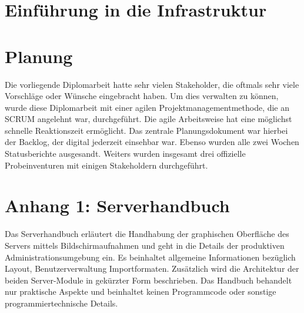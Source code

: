 \documentclass[
    headings=optiontotocandhead,%
    twoside,
    numbers=noenddot,%
    toc=flat, %
    12pt, %
    titlepage, %
    parskip=full, %
    listof=totoc, %
    listof=flat, %
    numbers=noenddot, %
    bibliography=totoc, %
    a4paper,DIV=14,
    BCOR=15mm,
]{scrbook}
\begin{document}

%







\chapter{Einführung in die Infrastruktur}




\renewcommand{\kapitelautor}{}

\chapter{Planung}

Die vorliegende Diplomarbeit hatte sehr vielen Stakeholder, die oftmals sehr viele Vorschläge oder Wünsche eingebracht haben. Um dies verwalten zu können, wurde diese Diplomarbeit mit einer agilen Projektmanagementmethode, die an SCRUM angelehnt war, durchgeführt. Die agile Arbeitsweise hat eine möglichst schnelle Reaktionszeit ermöglicht. Das zentrale Planungsdokument war hierbei der Backlog, der digital jederzeit einsehbar war. Ebenso wurden alle zwei Wochen Statusberichte ausgesandt. Weiters wurden insgesamt drei offizielle Probeinventuren mit einigen Stakeholdern durchgeführt.


% 

% 

% 


\appendix
\chapter{Anhang 1: Serverhandbuch\label{chap:Anhang-1}}

Das Serverhandbuch erläutert die Handhabung der graphischen Oberfläche des Servers mittels Bildschirmaufnahmen und geht in die Details der produktiven Administrationsumgebung ein. Es beinhaltet allgemeine Informationen bezüglich Layout, Benutzerverwaltung Importformaten. Zusätzlich wird die Architektur der beiden Server-Module in gekürzter Form beschrieben. Das Handbuch behandelt nur praktische Aspekte und beinhaltet keinen Programmcode oder sonstige programmiertechnische Details. 
\end{document}
